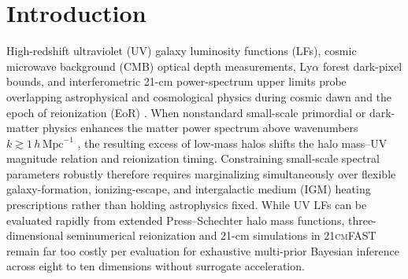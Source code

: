 \documentclass[aps,prd,reprint,superscriptaddress,nofootinbib,amsmath,amssymb,floatfix,longbibliography]{revtex4-2}
\begin{document}
\begin{abstract}
$t_\star$ PS+LF posterior bias ($0.6326 \to 0.4942$, $0.524\sigma \to 0.017\sigma$ around truth $0.500$). Extending this local surrogate to anisotropic Mat\'ern-5/2 automatic-relevance-determination Gaussian-process (ARD-GP) patches across four lightcone/coeval benchmarks suppresses held-out $L_2\ p_{90}$ residuals to $0.0278\text{--}0.0656$ (from $0.6699\text{--}3.9249$), enabling three-way 8D hybrid Stretch+GMM MCMC chains ($230{,}400$ post-burn samples each) at $\mathrm{PL}\,(10,0.968)$ ($\max\widehat{R}=1.0071$, $|\mathrm{med\_z}|\le 0.383$), $\mathrm{BT}\,(10,2.5)$ ($\max\widehat{R}=1.0105$), and $\mathrm{BT}\,(3,2.0)$ ($\max\widehat{R}=1.0049$).
\end{abstract}

\maketitle

\section{Introduction}\label{sec:intro}

High-redshift ultraviolet (UV) galaxy luminosity functions (LFs), cosmic microwave background (CMB) optical depth measurements, Ly$\alpha$ forest dark-pixel bounds, and interferometric 21-cm power-spectrum upper limits probe overlapping astrophysical and cosmological physics during cosmic dawn and the epoch of reionization (EoR) \cite{Mesinger2011,Park2019,Planck2018,McGreer2015,Donnan2024,HERA2023}. When nonstandard small-scale primordial or dark-matter physics enhances the matter power spectrum above wavenumbers $k \gtrsim 1\,h\,\mathrm{Mpc}^{-1}$ \cite{Parashari23JWSTPPS,Hira24bluetilt,MunozDvorkin2020}, the resulting excess of low-mass halos shifts the halo mass--UV magnitude relation and reionization timing. Constraining small-scale spectral parameters robustly therefore requires marginalizing simultaneously over flexible galaxy-formation, ionizing-escape, and intergalactic medium (IGM) heating prescriptions rather than holding astrophysics fixed. While UV LFs can be evaluated rapidly from extended Press--Schechter halo mass functions, three-dimensional seminumerical reionization and 21-cm simulations in \textsc{21cmFAST} \cite{Mesinger2011,Murray2020} remain far too costly per evaluation for exhaustive multi-prior Bayesian inference across eight to ten dimensions without surrogate acceleration.
\end{document}
